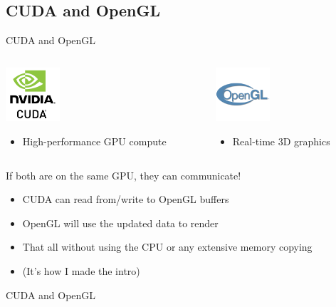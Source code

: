 \subsection{CUDA and OpenGL}\label{subsec:cuda-opengl}
\begin{frame}[t]{CUDA and OpenGL}
    \begin{columns}
        \begin{column}{0.5\textwidth}
            \centerline{\includegraphics[height=2cm]{./figures/cuda}}
            \begin{itemize}
                \item High-performance GPU compute
            \end{itemize}
        \end{column}
        \begin{column}{0.5\textwidth}
            \centerline{\includegraphics[height=2cm]{./figures/opengl}}
            \begin{itemize}
                \item Real-time 3D graphics
            \end{itemize}
        \end{column}
    \end{columns}
    \centerline{If both are on the same GPU, they can communicate!}
    \begin{itemize}
        \item CUDA can read from/write to OpenGL buffers
        \item OpenGL will use the updated data to render
        \item That all without using the CPU or any extensive memory copying
        \item (It's how I made the intro)
    \end{itemize}
\end{frame}

\begin{frame}{CUDA and OpenGL}
    \centerline{\resizebox{0.95\linewidth}{!}{}}
\end{frame}

